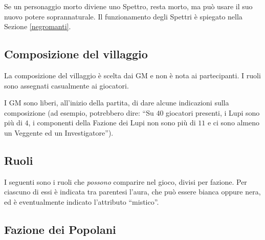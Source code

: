 \documentclass[a4paper,10pt]{article}
\begin{document}
Se un personaggio morto diviene uno Spettro, resta morto, ma può usare il suo nuovo potere soprannaturale. Il funzionamento degli Spettri è spiegato nella Sezione \ref{negromanti}.

\subsection{Composizione del villaggio}
 
La composizione del villaggio è scelta dai GM e non è nota ai partecipanti. I ruoli sono assegnati casualmente ai giocatori.

I GM sono liberi, all'inizio della partita, di dare alcune indicazioni sulla composizione (ad esempio, potrebbero dire: ``Su $40$ giocatori presenti, i Lupi sono più di $4$, i componenti della Fazione dei Lupi non sono più di $11$ e ci sono almeno un Veggente ed un Investigatore'').

\subsection{Ruoli}
\label{ruoli}


I seguenti sono i ruoli che \emph{possono} comparire nel gioco, divisi per fazione. Per ciascuno di essi è indicata tra parentesi l'aura, che può essere bianca oppure nera, ed è eventualmente indicato l'attributo ``mistico''.

\subsection*{Fazione dei Popolani}
\end{document}
